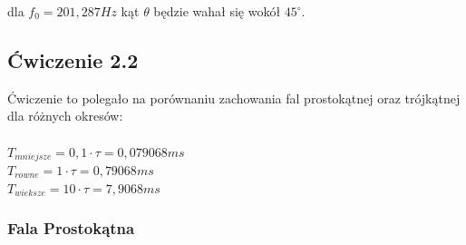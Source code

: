\documentclass{article}
\begin{document}
        dla $f_0 = 201,287 Hz$ kąt $\theta$ będzie wahał się wokół $45^\circ$.

    \subsection{Ćwiczenie 2.2}
      Ćwiczenie to polegało na porównaniu zachowania fal prostokątnej oraz trójkątnej dla różnych okresów:\\ \\
      $T_{mniejsze}= 0,1 \cdot \tau = 0,079068 ms$ \\
      $T_{rowne} = 1 \cdot \tau = 0,79068 ms$ \\
      $T_{wieksze} = 10 \cdot \tau = 7,9068 ms$
     
      \subsubsection{Fala Prostokątna}
\end{document}
